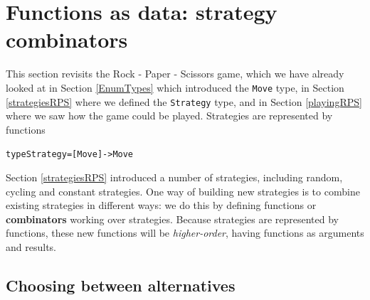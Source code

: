 \section{Functions as data: strategy combinators}
\label{strategyCombs}

This section revisits the Rock - Paper - Scissors game, which we have already looked at in Section \ref{EnumTypes} which introduced the \texttt{Move} type, in Section \ref{strategiesRPS} where we defined the \texttt{Strategy} type, and in Section \ref{playingRPS} where we saw how the game could be played. Strategies are represented by functions
\begin{alltt}
type Strategy = [Move] -> Move
\end{alltt}
Section \ref{strategiesRPS} introduced a number of strategies, including random, cycling and constant strategies. One way of building new strategies is to combine existing strategies in different ways: we do this by defining functions or \textbf{combinators} working over strategies. Because strategies are represented by functions, these new functions will be \emph{higher-order}, having functions as arguments and results.


\subsection*{Choosing between alternatives}

